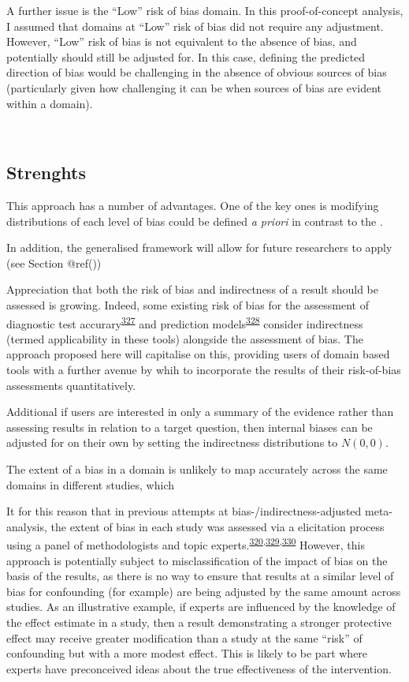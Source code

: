 \documentclass[a4paper, twoside]{templates/ociamthesis}
\begin{document}
A further issue is the ``Low'' risk of bias domain. In this proof-of-concept analysis, I assumed that domains at ``Low'' risk of bias did not require any adjustment. However, ``Low'' risk of bias is not equivalent to the absence of bias, and potentially should still be adjusted for. In this case, defining the predicted direction of bias would be challenging in the absence of obvious sources of bias (particularly given how challenging it can be when sources of bias are evident within a domain).

~

\hypertarget{strenghts}{%
\subsection{Strenghts}\label{strenghts}}

This approach has a number of advantages. One of the key ones is modifying distributions of each level of bias could be defined \emph{a priori} in contrast to the .

In addition, the generalised framework will allow for future researchers to apply (see Section @ref())

Appreciation that both the risk of bias and indirectness of a result should be assessed is growing. Indeed, some existing risk of bias for the assessment of diagnostic test accurary\textsuperscript{\protect\hyperlink{ref-whiting2011a}{327}} and prediction models\textsuperscript{\protect\hyperlink{ref-moons2019}{328}} consider indirectness (termed applicability in these tools) alongside the assessment of bias. The approach proposed here will capitalise on this, providing users of domain based tools with a further avenue by whih to incorporate the results of their risk-of-bias assessments quantitatively.

Additional if users are interested in only a summary of the evidence rather than assessing results in relation to a target question, then internal biases can be adjusted for on their own by setting the indirectness distributions to \(N(0,0)\).

The extent of a bias in a domain is unlikely to map accurately across the same domains in different studies, which

It for this reason that in previous attempts at bias-/indirectness-adjusted meta-analysis, the extent of bias in each study was assessed via a elicitation process using a panel of methodologists and topic experts.\textsuperscript{\protect\hyperlink{ref-turner2009}{320},\protect\hyperlink{ref-thompson2011}{329},\protect\hyperlink{ref-wilks2011}{330}} However, this approach is potentially subject to misclassification of the impact of bias on the basis of the results, as there is no way to ensure that results at a similar level of bias for confounding (for example) are being adjusted by the same amount across studies. As an illustrative example, if experts are influenced by the knowledge of the effect estimate in a study, then a result demonstrating a stronger protective effect may receive greater modification than a study at the same ``risk'' of confounding but with a more modest effect. This is likely to be part where experts have preconceived ideas about the true effectiveness of the intervention.
\end{document}
